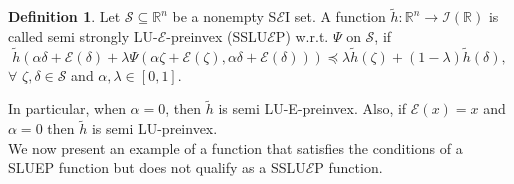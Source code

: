 \documentclass[12pt, reqno]{amsart}
\theoremstyle{definition}
\newtheorem{definition}{Definition}[section]
\theoremstyle{remark}
\numberwithin{equation}{section}
\begin{document}
\begin{definition}
   Let $\mathcal{S} \subseteq \mathbb{R}^{n}$ be a nonempty S$\mathcal{\mathcal{E}}$I set.  
A function $\tilde{h} \colon \mathbb{R}^{n} \to \mathcal{I}(\mathbb{R})$ is called semi strongly LU-$\mathcal{\mathcal{E}}$-preinvex (SSLU$\mathcal{\mathcal{E}}$P) w.r.t. $\Psi$ on $\mathcal{S}$, if  
\begin{equation*}
    \tilde{h}(\alpha \mathit{\delta}  + \mathcal{\mathcal{E}}(\mathit{\delta} ) + \lambda \Psi(\alpha \mathit{\zeta}  + \mathcal{\mathcal{E}}(\mathit{\zeta} ), \alpha \mathit{\delta}  + \mathcal{\mathcal{E}}(\mathit{\delta} ))) 
    \preceq \lambda \tilde{h}(\mathit{\zeta} ) + (1 - \lambda) \tilde{h}(\mathit{\delta} ),
\end{equation*}
$\forall$  $\mathit{\zeta} , \mathit{\delta}  \in \mathcal{S}$ and $\alpha, \lambda \in [0,1]$. 
\end{definition}
In particular, when $\alpha=0$, then $\tilde{h}$ is semi LU-E-preinvex. Also, if $\mathcal E{(x)}=x$ and $\alpha=0$ then $\tilde{h}$ is semi LU-preinvex.\\
We now present an example of a function that satisfies the conditions of a SLUEP function but does not qualify as a  SSLU$\mathcal{E}$P function.
\end{document}
